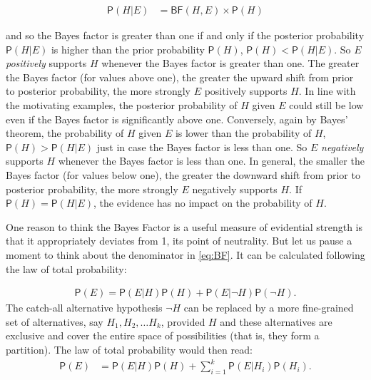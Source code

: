 \documentclass[
  10pt,
  dvipsnames,enabledeprecatedfontcommands]{scrartcl}
\newcommand{\pr}[1]{\mathsf{P}(#1)}
\begin{document}
\vspace{-3mm}

\begin{align*}
\pr{H \vert E} & = \mathsf{BF}(H, E) \times \pr{H}
\end{align*}

\noindent and so the Bayes factor is greater than one if and only if the
posterior probability \(\pr{H \vert E}\) is higher than the prior
probability \(\pr{H}\), \(\pr{H}<\pr{H\vert E}\). So \(E\)
\textit{positively} supports \(H\) whenever the Bayes factor is greater
than one. The greater the Bayes factor (for values above one), the
greater the upward shift from prior to posterior probability, the more
strongly \(E\) positively supports \(H\). In line with the motivating
examples, the posterior probability of \(H\) given \(E\) could still be
low even if the Bayes factor is significantly above one. Conversely,
again by Bayes' theorem, the probability of \(H\) given \(E\) is lower
than the probability of \(H\), \(\pr{H}>\pr{H\vert E}\) just in case the
Bayes factor is less than one. So \(E\) \textit{negatively} supports
\(H\) whenever the Bayes factor is less than one. In general, the
smaller the Bayes factor (for values below one), the greater the
downward shift from prior to posterior probability, the more strongly
\(E\) negatively supports \(H\). If \(\pr{H}=\pr{H\vert E}\), the
evidence has no impact on the probability of \(H\).

One reason to think the Bayes Factor is a useful measure of evidential
strength is that it appropriately deviates from 1, its point of
neutrality. But let us pause a moment to think about the denominator in
\eqref{eq:BF}. It can be calculated following the law of total
probability:

\vspace{-3mm}

\begin{align} \label{eq:lotpSimple}
\pr{E}= \pr{E \vert H} \pr{H}+\pr{E \vert \neg H} \pr{\neg H}.
\end{align} \noindent The catch-all alternative hypothesis \(\neg H\)
can be replaced by a more fine-grained set of alternatives, say
\(H_1, H_2, \dots H_k\), provided \(H\) and these alternatives are
exclusive and cover the entire space of possibilities (that is, they
form a partition). The law of total probability would then read:
\begin{align} \label{eq:lotpLong}
\pr{E} & = \pr{E\vert H}\pr{H} +\sum_{i=1}^k \pr{E\vert H_i}\pr{H_i}. 
\end{align}
\end{document}
